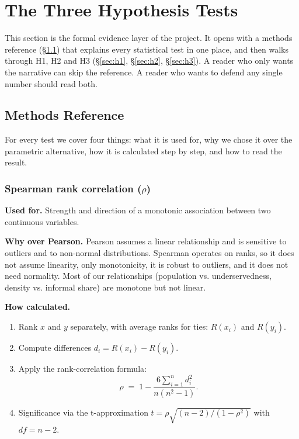 
\section{The Three Hypothesis Tests}
\label{sec:phase2-hypotheses}

This section is the formal evidence layer of the project. It opens with
a methods reference (\S\ref{sec:hyp-methods}) that explains every
statistical test in one place, and then walks through H1, H2 and H3
(\S\ref{sec:h1}, \S\ref{sec:h2}, \S\ref{sec:h3}). A reader who only
wants the narrative can skip the reference. A reader who wants to
defend any single number should read both.

\subsection{Methods Reference}
\label{sec:hyp-methods}

For every test we cover four things: what it is used for, why we
chose it over the parametric alternative, how it is calculated step
by step, and how to read the result.

\subsubsection{Spearman rank correlation \texorpdfstring{($\rho$)}{}}

\textbf{Used for.} Strength and direction of a monotonic association
between two continuous variables.

\textbf{Why over Pearson.} Pearson assumes a linear relationship and
is sensitive to outliers and to non-normal distributions. Spearman
operates on ranks, so it does not assume linearity, only monotonicity,
it is robust to outliers, and it does not need normality. Most of our
relationships (population vs. underservedness, density vs. informal
share) are monotone but not linear.

\textbf{How calculated.}

\begin{enumerate}
  \item Rank $x$ and $y$ separately, with average ranks for ties:
        $R(x_i)$ and $R(y_i)$.
  \item Compute differences $d_i = R(x_i) - R(y_i)$.
  \item Apply the rank-correlation formula:
        \begin{equation*}
          \rho \;=\; 1 - \dfrac{6 \sum_{i=1}^{n} d_i^2}{n(n^2 - 1)}.
        \end{equation*}
  \item Significance via the t-approximation
        $t = \rho \sqrt{(n-2)/(1-\rho^2)}$ with $df = n-2$.
\end{enumerate}

